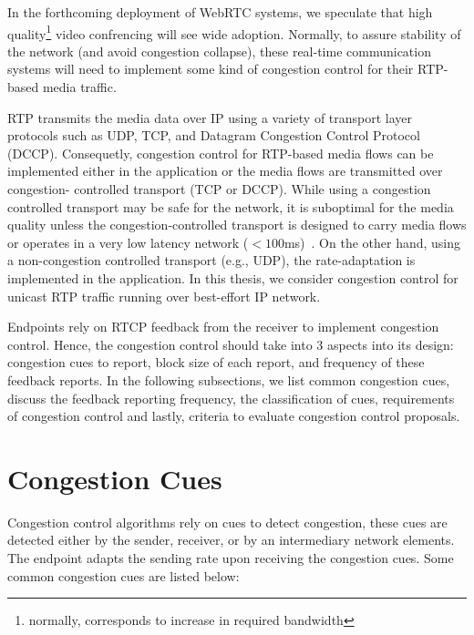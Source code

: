 In the forthcoming deployment of WebRTC systems, we speculate that high
quality\footnote{normally, corresponds to increase in required bandwidth}
video confrencing will see wide adoption. Normally, to assure stability of the
network (and avoid congestion collapse), these real-time communication systems
will need to implement some kind of congestion control for their RTP-based
media traffic.

RTP transmits the media data over IP using a variety of transport layer
protocols such as UDP, TCP, and Datagram Congestion Control Protocol (DCCP).
Consequetly, congestion control for RTP-based media flows can be implemented
either in the application or the media flows are transmitted over congestion-%
controlled transport (TCP or DCCP). While using a congestion controlled
transport may be safe for the network, it is suboptimal for the media quality
unless the congestion-controlled transport is designed to carry media flows or
operates in a very low latency network ($<100$ms)~\cite{Brosh:tcp-real-time}.
On the other hand, using a non-congestion controlled transport (e.g., UDP),
the rate-adaptation is implemented in the application.  In this thesis, we
consider congestion control for unicast RTP traffic running over best-effort
IP network.


Endpoints rely on RTCP feedback from the receiver to implement congestion
control. Hence, the congestion control should take into 3 aspects into its
design: congestion cues to report, block size of each report, and frequency of
these feedback reports. In the following subsections, we list common
congestion cues, discuss the feedback reporting frequency, the classification
of cues, requirements of congestion control and lastly, criteria to evaluate
congestion control proposals.

\section{Congestion Cues}
\label{fw.cues}

Congestion control algorithms rely on cues to detect congestion, these cues
are detected either by the sender, receiver, or by an intermediary network
elements. The endpoint adapts the sending rate upon receiving the congestion
cues. Some common congestion cues are listed below:

